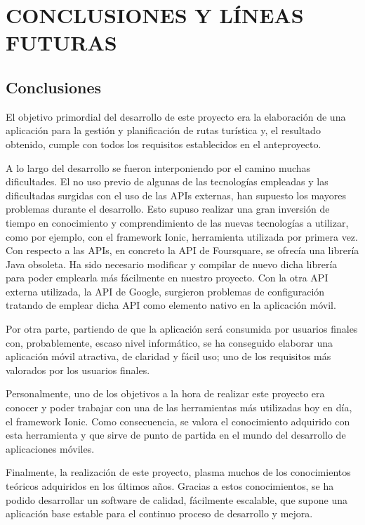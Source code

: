 \chapter[Conclusiones y líneas futuras]{
  \label{chp:conclusiones}
  CONCLUSIONES Y LÍNEAS FUTURAS
}
\thispagestyle{numberingStyle}
\pagestyle{numberingStyle}

\section{Conclusiones}

El objetivo primordial del desarrollo de este proyecto era la elaboración de una aplicación para la gestión y planificación de rutas turística y, el resultado obtenido, cumple con todos los requisitos establecidos en el anteproyecto.

A lo largo del desarrollo se fueron interponiendo por el camino muchas dificultades. El no uso previo de algunas de las tecnologías empleadas  y las dificultadas surgidas con el uso de las APIs externas, han supuesto los mayores problemas durante el desarrollo. Esto supuso realizar una gran inversión de tiempo en conocimiento y comprendimiento de las nuevas tecnologías a utilizar, como por ejemplo, con el framework Ionic, herramienta utilizada por primera vez. Con respecto a las APIs, en concreto la API de Foursquare, se ofrecía una librería Java obsoleta. Ha sido necesario modificar y compilar de nuevo dicha librería para poder emplearla más fácilmente en nuestro proyecto. Con la otra API externa utilizada, la API de Google, surgieron problemas de configuración tratando de emplear dicha API como elemento nativo en la aplicación móvil.

Por otra parte, partiendo de que la aplicación será consumida por usuarios finales con, probablemente, escaso nivel informático, se ha conseguido elaborar una aplicación móvil atractiva, de claridad y fácil uso; uno de los requisitos más valorados por los usuarios finales.

Personalmente, uno de los objetivos a la hora de realizar este proyecto era conocer y poder trabajar con una de las herramientas más utilizadas hoy en día, el framework Ionic. Como consecuencia, se valora el conocimiento adquirido con esta herramienta y que sirve de punto de partida en el mundo del desarrollo de aplicaciones móviles.

Finalmente, la realización de este proyecto, plasma muchos de los conocimientos teóricos adquiridos en los últimos años. Gracias a estos conocimientos, se ha podido desarrollar un software de calidad, fácilmente escalable, que supone una aplicación base estable para el continuo proceso de desarrollo y mejora.


